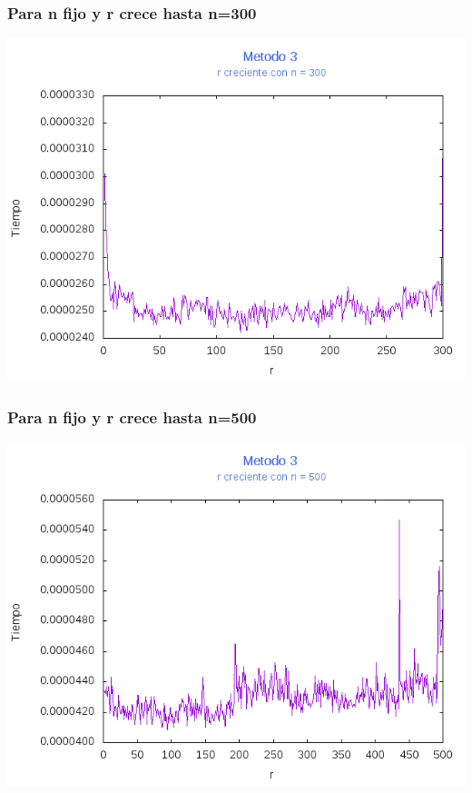 \documentclass[12pt,letterpaper]{scrartcl}
\begin{document}
\subsubsection{Para n fijo y r crece hasta n=300}
\includegraphics[scale=1]{Metodo3/plot300m3}

\subsubsection{Para n fijo y r crece hasta n=500}
\includegraphics[scale=1]{Metodo3/plot500m3}
\end{document}
